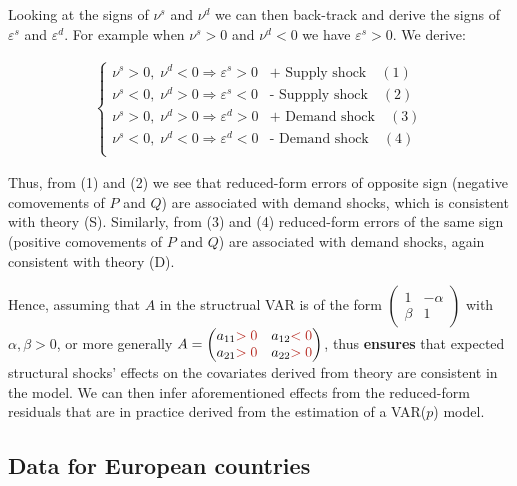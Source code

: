 \noindent Looking at the signs of $\nu^{s}$ and $\nu^{d}$ we can then back-track and derive the signs of $\varepsilon^{s}$ and $\varepsilon^{d}$. 
For example when $\nu^{s}>0$ and $\nu^{d}<0$ we have $\varepsilon^{s}>0$. We derive:

\begin{align*}
    \begin{cases}
        \nu^{s}>0,\; \nu^{d}<0 \Rightarrow \varepsilon^{s}>0 & \textrm{+ Supply shock} \quad (1)\\
        \nu^{s}<0,\; \nu^{d}>0 \Rightarrow \varepsilon^{s}<0 & \textrm{- Suppply shock} \quad (2) \\
        \nu^{s}>0,\; \nu^{d}>0 \Rightarrow \varepsilon^{d}>0 & \textrm{+ Demand shock}  \quad (3) \\
        \nu^{s}<0,\; \nu^{d}<0 \Rightarrow \varepsilon^{d}<0 & \textrm{- Demand shock}  \quad (4) \\
    \end{cases}  
\end{align*}

\noindent Thus, from (1) and (2) we see that reduced-form errors of opposite sign (negative comovements of $P$ and $Q$) are associated with demand shocks, which is consistent with theory (S).
Similarly, from (3) and (4) reduced-form errors of the same sign (positive comovements of $P$ and $Q$) are associated with demand shocks, again consistent with theory (D).

\noindent Hence, assuming that $A$ in the structrual VAR is of the form $\begin{pmatrix} 1 & - \alpha \\ \beta & 1 \end{pmatrix}$ with $\alpha,\beta>0$, or more generally $A =\begin{pmatrix} a_{11}\red{>0} & a_{12}\red{<0} \\ a_{21}\red{>0} & a_{22}\red{>0} \end{pmatrix}$, thus \textbf{ensures} that expected structural shocks' effects on the covariates derived from theory are consistent in the model. 
We can then infer aforementioned effects from the reduced-form residuals that are in practice derived from the estimation of a VAR($p$) model.

\subsection{Data for European countries}

